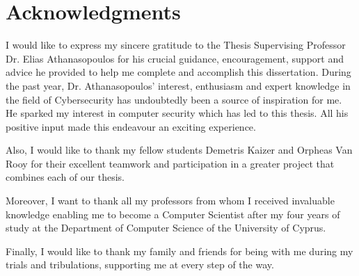 \section*{\LARGE{Acknowledgments}}

I would like to express my sincere gratitude to the Thesis Supervising Professor Dr. Elias Athanasopoulos for his crucial guidance, encouragement, support and advice he provided to help me complete and accomplish this dissertation. During the past year, Dr. Athanasopoulos' interest, enthusiasm and expert knowledge in the field of Cybersecurity has undoubtedly been a source of inspiration for me. He sparked my interest in computer security which has led to this thesis. All his positive input made this endeavour an exciting experience. 

Also, I would like to thank my fellow students Demetris Kaizer and Orpheas Van Rooy for their excellent teamwork and participation in a greater project that combines each of our thesis.

Moreover, I want to thank all my professors from whom I received invaluable knowledge enabling me to become a Computer Scientist after my four years of study at the Department of Computer Science of the University of Cyprus.

Finally, I would like to thank my family and friends for being with me during my trials and tribulations, supporting me at every step of the way.